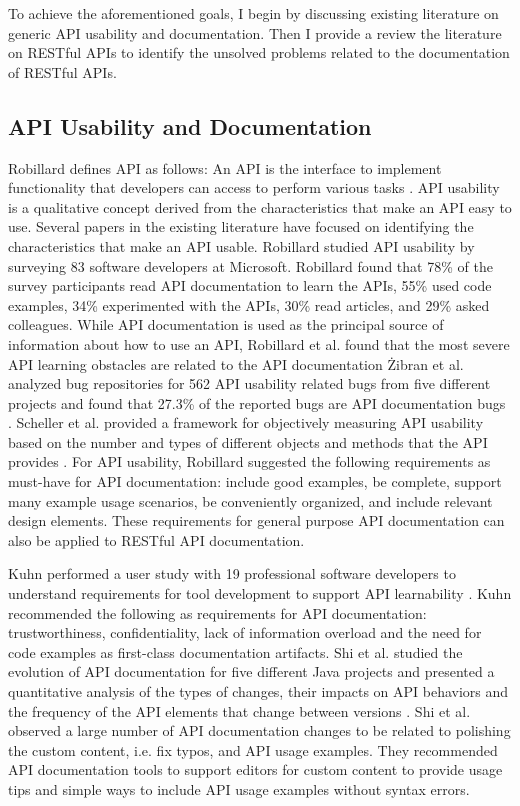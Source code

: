 \documentclass[11pt,oneside]{book}
\begin{document}
To achieve the aforementioned goals, I begin by discussing existing literature on generic API usability and documentation. Then I provide a review the literature on RESTful APIs to identify the unsolved problems related to the documentation of RESTful APIs.


\subsection{API Usability and Documentation}

Robillard defines API as follows: An API is the interface to implement functionality that developers can access to perform various tasks \cite{Robillard_a_field_study} \cite{Robillard_what_makes}. API usability is a qualitative concept derived from the characteristics that make an API easy to use. Several papers in the existing literature have focused on identifying the characteristics that make an API usable. Robillard studied API usability by surveying 83 software developers at Microsoft. Robillard found that 78\% of the survey participants read API documentation to learn the APIs, 55\% used code examples, 34\% experimented with the APIs, 30\% read articles, and 29\% asked colleagues. While API documentation is used as the principal source of information about how to use an API, Robillard et al. found that the most severe API learning obstacles are related to the API documentation \cite{Robillard_a_field_study} \. Zibran et al. analyzed bug repositories  for 562 API usability related bugs from five different projects and found that 27.3\% of the reported bugs are API documentation bugs \cite{zibran2011useful}. Scheller et al. provided a framework for objectively measuring API usability based on the number and types of different objects and methods that the API provides \cite{scheller2015automated}. For API usability, Robillard suggested the following requirements as must-have for API documentation: include good examples, be complete, support many example usage scenarios, be conveniently organized, and include relevant design elements. These requirements for general purpose API documentation can also be applied to RESTful API documentation.

Kuhn performed a user study with 19 professional software developers to understand requirements for tool development to support API learnability \cite{Kuhn_on_designing}. Kuhn recommended the following as requirements for API documentation: trustworthiness, confidentiality, lack of information overload and the need for code examples as first-class documentation artifacts. Shi et al. studied the evolution of API documentation for five different Java projects and presented a quantitative analysis of the types of changes, their impacts on API behaviors and the frequency of the API elements that change between versions \cite{shi2011empirical}. Shi et al. observed a large number of API documentation changes to be related to polishing the custom content, i.e. fix typos, and API usage examples. They recommended API documentation tools to support editors for custom content to provide usage tips and simple ways to include API usage examples without syntax errors.
\end{document}
